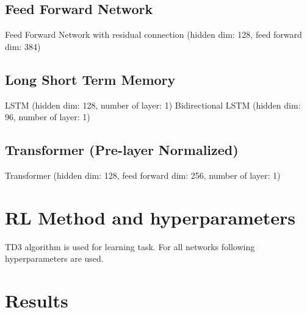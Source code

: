 \subsection{Feed Forward Network}
Feed Forward Network with residual connection (hidden dim: 128, feed forward dim: 384)
\subsection{Long Short Term Memory}
LSTM (hidden dim: 128, number of layer: 1)
Bidirectional LSTM (hidden dim: 96, number of layer: 1)
\subsection{Transformer (Pre-layer Normalized)}
Transformer (hidden dim: 128, feed forward dim: 256, number of layer: 1)

\section{RL Method and hyperparameters}
TD3 algorithm is used for learning task. For all networks following hyperparameters are used.\\

\section{Results}